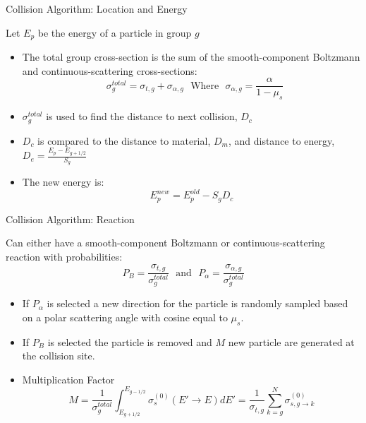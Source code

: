 \documentclass{beamer}
\begin{document}
\begin{frame}{Collision Algorithm: Location and Energy}

Let $E_p$ be the energy of a particle in group $g$

  \begin{itemize}
    \item The total group cross-section is the sum of the smooth-component Boltzmann and continuous-scattering cross-sections: $$~~~ \sigma_g^{total} = \sigma_{t,g} + \sigma_{\alpha,g} ~~~\text{Where}~~~ \sigma_{\alpha,g}=\frac{\alpha}{1-\mu_s}$$


       \item $\sigma_g^{total}$ is used to find the distance to next collision, $D_c$

      \item $D_c$ is compared to the distance to material, $D_m$, and distance to energy, $D_e = \frac{E_p - E_{g+1/2}}{S_g}$
   
      \item The new energy is: $$E_p^{new} = E_p^{old} - S_gD_c$$
       
     \end{itemize}

\end{frame}

\begin{frame}{Collision Algorithm: Reaction}

Can either have a smooth-component Boltzmann or continuous-scattering reaction with probabilities: $$ P_B=\frac{\sigma_{t,g}}{\sigma_g^{total} }~~~\text{and}~~~
                     P_{\alpha}=\frac{\sigma_{\alpha,g}}{\sigma_g^{total} }$$

  \begin{itemize}
    \item If $P_{\alpha}$ is selected a new direction for the particle is randomly sampled based on a polar scattering angle with cosine equal to $\mu_s$.
    
    \item  If $P_B$ is selected the particle is removed and $M$ new particle are generated at the collision site.

    \item Multiplication Factor
   $$ M = \frac{1}{\sigma_g^{total}} \int_{E_{g+1/2}}^{E_{g-1/2}}  \sigma_s^{(0)}(E'\to E)dE'=\frac{1}{\sigma_{t,g}}\sum_{k=g}^{N}\sigma_{s,g\to k}^{(0)}$$

       
     \end{itemize}

\end{frame}
\end{document}
